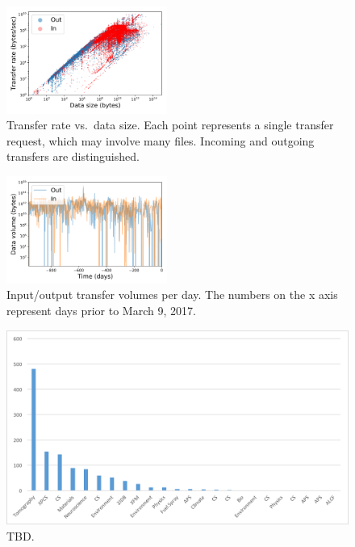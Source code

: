 \documentclass[sigconf]{acmart}
\newcommand\ian[1]{}
\newcommand\ian[1]{{\color{blue}[Ian: #1]}}
\begin{document}
\begin{figure}
\centering
\includegraphics[width=0.47\textwidth,trim=0.14in 0.15in 0.15in 0.2in,clip]{Figures/petrel-size-time.png}
\vspace{-2ex}

\caption{Transfer rate vs.\ data size.
Each point represents a single transfer request, which may involve many files.
Incoming and outgoing transfers are distinguished.\label{fig:ratesize}}
\end{figure}

\begin{figure}
\centering
 \includegraphics[width=0.47\textwidth,trim=0.14in 0.15in 0.15in 0.2in,clip]{Figures/petrel-bytes-day.png}
 
 \vspace{-2ex}

\caption{Input/output transfer volumes per day. The numbers on the x axis represent days prior to March 9, 2017.}
\label{fig:perday}
\end{figure} 


\begin{figure}
\centering
\includegraphics[trim=0.1in 0.1in 0.1in 0.1in,clip,width=\columnwidth]{Figures/usage.png}

\vspace{-2ex}

\caption{TBD\ian{to improve if we want to include it.}.\label{fig:usage3}}
\end{figure}
\end{document}
